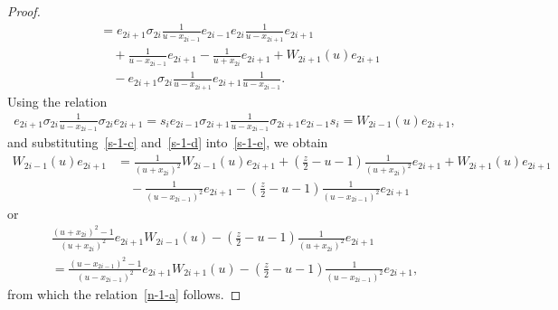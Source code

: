 \documentclass[11pt,a4paper,reqno,svgnames]{amsart}
\theoremstyle{plain}
\theoremstyle{definition}
\numberwithin{equation}{section}
\begin{document}
\begin{proof}
\begin{equation}
\begin{split}
&=e_{2i+1}\sigma_{2i}\frac{1}{u-x_{2i-1}}e_{2i-1}e_{2i}\frac{1}{u-x_{2i+1}}e_{2i+1}\\
&\quad +\frac{1}{u-x_{2i-1}}e_{2i+1}
-\frac{1}{u+x_{2i}}e_{2i+1}+W_{2i+1}(u)e_{2i+1}\\
&\quad-e_{2i+1}\sigma_{2i}\frac{1}{u-x_{2i+1}}e_{2i+1}\frac{1}{u-x_{2i-1}}.
\end{split}
\end{equation}
Using the relation
\begin{align*}
e_{2i+1}\sigma_{2i}\frac{1}{u-x_{2i-1}}\sigma_{2i}e_{2i+1}
=s_i e_{2i-1}\sigma_{2i+1}\frac{1}{u-x_{2i-1}}\sigma_{2i+1}e_{2i-1}s_i={W_{2i-1}(u)}e_{2i+1},
\end{align*}
and substituting~\eqref{s-1-c} and~\eqref{s-1-d} into~\eqref{s-1-e}, we obtain
\begin{align*}
W_{2i-1}(u)e_{2i+1}&=\frac{1}{(u+x_{2i})^2}W_{2i-1}(u)e_{2i+1}+({\textstyle\frac{z}{2}}-u-1)\frac{1}{(u+x_{2i})^2}e_{2i+1}+W_{2i+1}(u)e_{2i+1}\\
&\quad-\frac{1}{(u-x_{2i-1})^2}e_{2i+1}-({\textstyle\frac{z}{2}}-u-1)\frac{1}{(u-x_{2i-1})^2}e_{2i+1}
\end{align*}
or 
\begin{multline*}
\frac{(u+x_{2i})^2-1}{(u+x_{2i})^2}e_{2i+1}W_{2i-1}(u)-({\textstyle\frac{z}{2}}-u-1)\frac{1}{(u+x_{2i})^2}e_{2i+1}\\
=\frac{(u-x_{2i-1})^2-1}{(u-x_{2i-1})^2}e_{2i+1}W_{2i+1}(u)-({\textstyle\frac{z}{2}}-u-1)\frac{1}{(u-x_{2i-1})^2}e_{2i+1},
\end{multline*}
from which the relation~\eqref{n-1-a} follows.


\end{proof}
\end{document}
